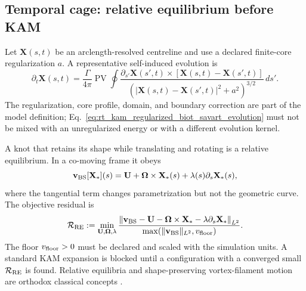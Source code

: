 \subsection{Temporal cage: relative equilibrium before KAM}
\label{subsec:rt_kam_temporal_cage}

Let \(\mathbf X(s,t)\) be an arclength-resolved centreline and use a declared
finite-core regularization \(a\).  A representative self-induced evolution is
\begin{equation}
    \partial_t\mathbf X(s,t)
    =
    \frac{\Gamma}{4\pi}
    \operatorname{PV}\!\oint
    \frac{
    \partial_{s'}\mathbf X(s',t)
    \times
    [\mathbf X(s,t)-\mathbf X(s',t)]
    }{
    \left(
    |\mathbf X(s,t)-\mathbf X(s',t)|^2+a^2
    \right)^{3/2}
    }
    \,ds'.
    \label{eq:rt_kam_regularized_biot_savart_evolution}
\end{equation}
The regularization, core profile, domain, and boundary correction are part of
the model definition; Eq.~\eqref{eq:rt_kam_regularized_biot_savart_evolution}
must not be mixed with an unregularized energy or with a different evolution
kernel.

A knot that retains its shape while translating and rotating is a relative
equilibrium.  In a co-moving frame it obeys
\begin{equation}
    \mathbf v_{\rm BS}[\mathbf X_*](s)
    =
    \mathbf U
    +
    \boldsymbol\Omega\times\mathbf X_*(s)
    +
    \lambda(s)\partial_s\mathbf X_*(s),
    \label{eq:rt_kam_relative_equilibrium_condition}
\end{equation}
where the tangential term changes parametrization but not the geometric curve.
The objective residual is
\begin{equation}
    \mathcal R_{\rm RE}
    :=
    \min_{\mathbf U,\boldsymbol\Omega,\lambda}
    \frac{
    \left\lVert
    \mathbf v_{\rm BS}
    -\mathbf U
    -\boldsymbol\Omega\times\mathbf X_*
    -\lambda\partial_s\mathbf X_*
    \right\rVert_{L^2}
    }{
    \max\!\left(
    \lVert\mathbf v_{\rm BS}\rVert_{L^2},
    v_{\rm floor}
    \right)
    }.
    \label{eq:rt_kam_relative_equilibrium_residual}
\end{equation}
The floor \(v_{\rm floor}>0\) must be declared and scaled with the simulation
units.  A standard KAM expansion is blocked until a configuration with a
converged small \(\mathcal R_{\rm RE}\) is found.  Relative equilibria and
shape-preserving vortex-filament motion are orthodox classical concepts
\cite{Kida1981VortexFilamentForm}.

